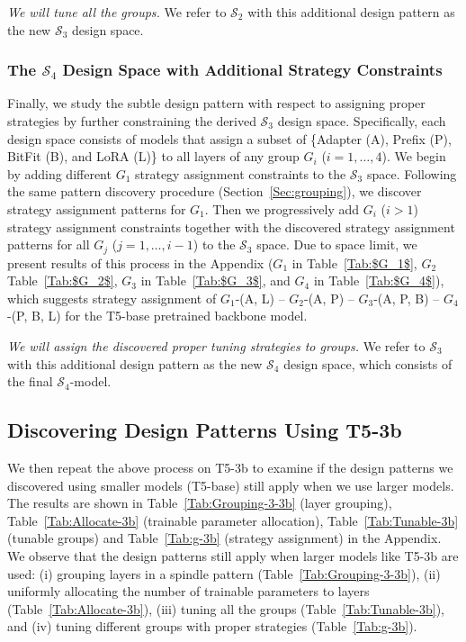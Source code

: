 \emph{We will tune all the groups.} We refer to
$\mathcal{S}_2$ with this additional design pattern as the new $\mathcal{S}_3$ design space.



\subsubsection{The $\mathcal{S}_4$ Design Space with Additional Strategy Constraints}
\label{subsec:s4}

Finally, we study the subtle design pattern with respect to assigning proper strategies by further constraining the derived $\mathcal{S}_3$ design space. Specifically, each design space consists of models that assign a subset of \{Adapter (A), Prefix (P), BitFit (B), and LoRA (L)\} to all layers of any group $G_i$ ($i = 1, \ldots, 4$). We begin by adding different $G_1$ strategy assignment constraints to the $\mathcal{S}_3$ space. Following the same pattern discovery procedure (Section~\ref{Sec:grouping}),
we discover strategy assignment patterns for $G_1$. Then we progressively add $G_i$ ($i>1$) strategy assignment constraints together with the discovered strategy assignment patterns for all $G_j$ ($j = 1, \ldots, i-1$) to the $\mathcal{S}_3$ space. Due to space limit, we present results of this process in the Appendix ($G_1$ in Table~\ref{Tab:$G_1$}, $G_2$ Table~\ref{Tab:$G_2$}, $G_3$ in Table~\ref{Tab:$G_3$}, and $G_4$ in Table~\ref{Tab:$G_4$}),
which suggests strategy assignment of $G_1$-(A, L)  -- $G_2$-(A, P) -- $G_3$-(A, P, B)  -- $G_4$-(P, B, L) for the T5-base pretrained backbone model.

\emph{We will assign the discovered proper tuning strategies to groups.} We refer to
$\mathcal{S}_3$ with this additional design pattern as the new $\mathcal{S}_4$ design space, which consists of the final  $\mathcal{S}_4$-model.

\subsection{Discovering Design Patterns Using T5-3b}
\label{subsec:s4-3b}

We then repeat the above process on T5-3b to examine if the design patterns we discovered using smaller models (T5-base) still apply when we use larger models. The results are shown in Table~\ref{Tab:Grouping-3-3b} (layer grouping), Table~\ref{Tab:Allocate-3b} (trainable parameter allocation),  Table~\ref{Tab:Tunable-3b} (tunable groups) and Table~\ref{Tab:g-3b} (strategy assignment) in the Appendix. We observe that the design patterns still apply when larger models like T5-3b are used: (i) grouping layers in a spindle pattern (Table~\ref{Tab:Grouping-3-3b}), (ii) uniformly allocating the number of trainable parameters to layers (Table~\ref{Tab:Allocate-3b}), (iii) tuning all the groups (Table~\ref{Tab:Tunable-3b}), and (iv) tuning different groups with proper strategies (Table~\ref{Tab:g-3b}).

